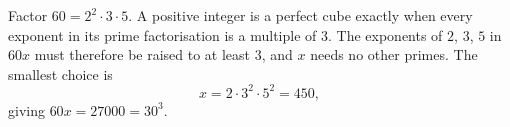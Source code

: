 Factor $60=2^2\cdot3\cdot5$. A positive integer is a perfect cube exactly when every exponent in its prime factorisation is a multiple of $3$. The exponents of $2$, $3$, $5$ in $60x$ must therefore be raised to at least $3$, and $x$ needs no other primes. The smallest choice is
\[
x=2\cdot3^2\cdot5^2=\boxed{450},
\]
giving $60x=27000=30^3$.
